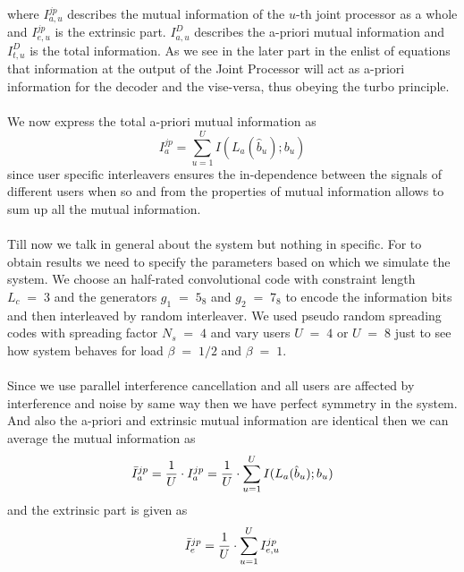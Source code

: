 where $I_{a,u}^{jp}$ describes the mutual information of the $u$-th joint processor as a whole and $I_{e,u}^{jp}$ is the extrinsic part. $I_{a,u}^{D}$ describes the a-priori mutual information and $I_{t,u}^{D}$ is the total information. As we see in the later part in the enlist of equations that information at the output of the Joint Processor will act as a-priori information for the decoder and the vise-versa, thus obeying the turbo principle. \\ \\
We now express the total a-priori mutual information as 
\begin{equation}
I_a^{jp}=\sum\limits_{u=1}^{U}I(L_a(\hat{b}_u);b_u)
\end{equation}
since user specific interleavers ensures the in-dependence between the signals of different users when so and from the properties of mutual information allows to sum up all the mutual information.\\ \\
Till now we talk in general about the system but nothing in specific. For to obtain results we need to specify the parameters based on which we simulate the system. We choose an half-rated convolutional code with constraint length $L_c\;=\;3$ and the generators $g_1\;=\;5_8$ and $g_2\;=\;7_8$ to encode the information bits and then interleaved by random interleaver. We used pseudo random spreading codes with spreading factor $N_s\;=\;4$ and vary users $U\;=\;4$ or $U\;=\;8$ just to see how system behaves for load $\beta\;=\;1/2$ and $\beta\;=\;1$. \\ \\
Since we use parallel interference cancellation and all users are affected by interference and noise by same way then we have perfect symmetry in the system. And also the a-priori and extrinsic mutual information are identical then we can average the mutual information as
\begin{equation}
\bar{I}_a^{jp}=\frac{\hbox{$1$}}{\hbox{$U$}}\cdot I_a^{jp}=\frac{\hbox{$1$}}{\hbox{$U$}}\cdot \sum\limits_{u=1}^{U}I(L_a(\hat{b}_u);b_u)
\end{equation}
and the extrinsic part is given as 
\begin{equation}
\bar{I}_e^{jp}=\frac{\hbox{$1$}}{\hbox{$U$}}\cdot \sum\limits_{u=1}^{U}I_{e,u}^{jp}
\end{equation}
